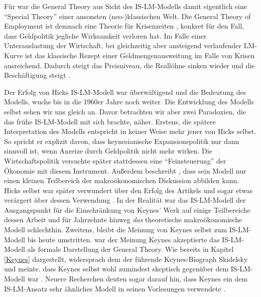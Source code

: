 Für \textcite{Hicks1937} war die General Theory aus Sicht des IS-LM-Modells damit eigentlich eine "`Special Theory"' einer ansonsten (neo-)klassischen Welt. Die General Theory of Employment ist demnach eine Theorie für Krisenzeiten \parencite[S. 155]{Hicks1937}, konkret für den Fall, dass Geldpolitik jegliche Wirksamkeit verloren hat. Im Falle einer Unterauslastung der Wirtschaft, bei gleichzeitig aber ansteigend verlaufender LM-Kurve ist das klassische Rezept einer Geldmengenausweitung im Falle von Krisen ausreichend. Dadurch steigt das Preisniveau, die Reallöhne sinken wieder und die Beschäftigung steigt \parencite[S. 30]{DeVroey2016}.

Der Erfolg von Hicks IS-LM-Modell war überwältigend und die Bedeutung des Modells, wuchs bis in die 1960er Jahre noch weiter. Die Entwicklung des Modells selbst sehen wir uns gleich an. Davor betrachten wir aber zwei Paradoxien, die das frühe IS-LM-Modell mit sich brachte, näher. Erstens, die spätere Interpretation des Modells entspricht in keiner Weise mehr jener von Hicks selbst. So spricht er explizit \parencite[S. 154]{Hicks1937} davon, dass keynesianische Expansionspolitik nur dann sinnvoll ist, wenn Anreize durch Geldpolitik nicht mehr wirken. Die Wirtschaftspolitik versuchte später stattdessen eine "`Feinsteuerung"' der Ökonomie mit diesem Instrument. Außerdem beschreibt \textcite[S. 158]{Hicks1937}, dass sein Modell nur einen kleinen Teilbereich der makroökonomischen Diskussion abbilden kann. Hicks selbst war später verwundert über den Erfolg des Artikels und sogar etwas verärgert über dessen Verwendung \parencite{Hicks1980}. In der Realität war das IS-LM-Modell der Ausgangspunkt für die Einschränkung von Keynes' Werk auf einige Teilbereiche dessen Arbeit und für Jahrzehnte hinweg \textit{das} theoretische makroökonomische Modell schlechthin. Zweitens, bleibt die Meinung von Keynes selbst zum IS-LM-Modell bis heute umstritten. \textcite[S. 120]{Patinkin1990} war der Meinung Keynes akzeptierte das IS-LM-Modell als formale Darstellung der General Theory. Wie bereits in Kapitel \ref{Keynes} dargestellt, widersprach dem der führende Keynes-Biograph Skidelsky und meinte. dass Keynes selbst wohl zumindest skeptisch gegenüber dem IS-LM-Modell war \parencite[S. 96]{Snowdon2005}. Neuere Recherchen deuten sogar darauf hin, dass Keynes ein dem IS-LM-Ansatz sehr ähnliches Modell in seinen Vorlesungen verwendete \parencite[S. 113]{Snowdon2005}.

